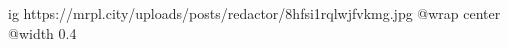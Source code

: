  
 
 
 
 

\ifcmt
  ig https://mrpl.city/uploads/posts/redactor/8hfsi1rqlwjfvkmg.jpg
  @wrap center
  @width 0.4
\fi
